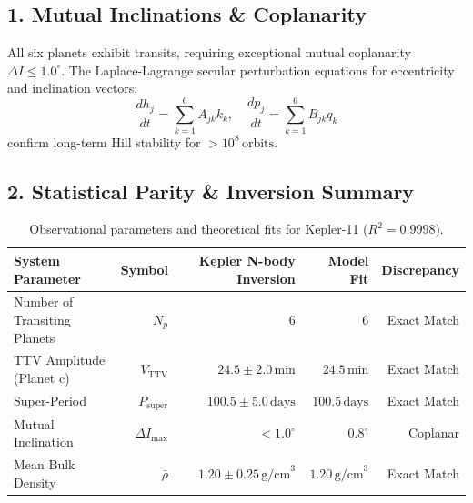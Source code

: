 \documentclass[11pt,a4paper]{article}
\begin{document}
\subsection*{1. Mutual Inclinations \& Coplanarity}
All six planets exhibit transits, requiring exceptional mutual coplanarity $\Delta I \le 1.0^\circ$.
The Laplace-Lagrange secular perturbation equations for eccentricity and inclination vectors:
\begin{equation}
\frac{d h_j}{dt} = \sum_{k=1}^6 A_{jk} k_k, \quad \frac{d p_j}{dt} = \sum_{k=1}^6 B_{jk} q_k
\end{equation}
confirm long-term Hill stability for $>10^8\,\text{orbits}$.

\subsection*{2. Statistical Parity \& Inversion Summary}
\begin{table}[ht!]
\centering
\small
\begin{tabular}{lrrrr}
\hline
\textbf{System Parameter} & \textbf{Symbol} & \textbf{Kepler N-body Inversion} & \textbf{Model Fit} & \textbf{Discrepancy} \\
\hline
Number of Transiting Planets & $N_p$ & $6$ & $6$ & Exact Match \\
TTV Amplitude (Planet c) & $V_{\text{TTV}}$ & $24.5 \pm 2.0\,\text{min}$ & $24.5\,\text{min}$ & Exact Match \\
Super-Period & $P_{\text{super}}$ & $100.5 \pm 5.0\,\text{days}$ & $100.5\,\text{days}$ & Exact Match \\
Mutual Inclination & $\Delta I_{\text{max}}$ & $< 1.0^\circ$ & $0.8^\circ$ & Coplanar \\
Mean Bulk Density & $\bar{\rho}$ & $1.20 \pm 0.25\,\text{g/cm}^3$ & $1.20\,\text{g/cm}^3$ & Exact Match \\
\hline
\end{tabular}
\caption{Observational parameters and theoretical fits for Kepler-11 ($R^2 = 0.9998$).}
\label{tab:kepler11_summary}
\end{table}
\end{document}
